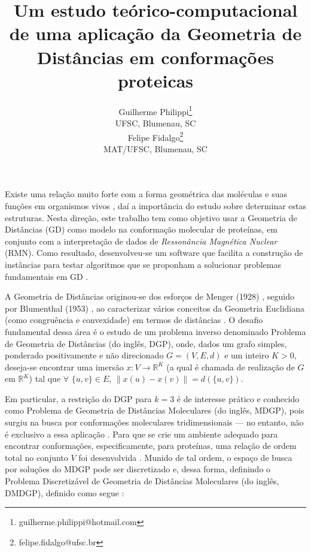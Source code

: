\documentclass[a4,11pt]{pssbmac}
\begin{document}
	
	\title{Um estudo teórico-computacional de uma aplicação da Geometria de Distâncias em conformações proteicas}
	
	\author{
		{\large Guilherme Philippi}\thanks{guilherme.philippi@hotmail.com}\\
		{\small UFSC, Blumenau, SC} \\
		{\large Felipe Fidalgo}\thanks{felipe.fidalgo@ufsc.br} \\
		{\small MAT/UFSC, Blumenau, SC} \\
	}
	\criartitulo
	
	Existe uma relação muito forte com a forma geométrica das moléculas e suas funções em organismos vivos \cite{bioquimicaLehninger}, daí a importância do estudo sobre determinar estas estruturas. Nesta direção, este trabalho tem como objetivo usar a Geometria de Distâncias (GD) como modelo na conformação molecular de proteínas, em conjunto com a interpretação de dados de \textit{Ressonância Magnética Nuclear} (RMN). Como resultado, desenvolveu-se um software que facilita a construção de instâncias para testar algoritmos que se proponham a solucionar problemas fundamentais em GD \cite{carlileGDandAplications}. 
	
	A Geometria de Distâncias originou-se dos esforços de Menger (1928) \cite{menger1928}, seguido por Blumenthal (1953) \cite{blumenthal}, ao caracterizar vários conceitos da Geometria Euclidiana (como congruência e convexidade) em termos de distâncias \cite{carlileGDandAplications}. O desafio fundamental dessa área é o estudo de um problema inverso denominado Problema de Geometria de Distâncias (do inglês, DGP), onde, dados um grafo simples, ponderado positivamente e não direcionado $G=(V,E, d)$ e um inteiro $K>0$, deseja-se encontrar uma imersão $x:V\rightarrow\mathbb{R}^K$ (a qual é chamada de realização de $G$ em $\mathbb{R}^K$) tal que $\forall$ $\{u,v\} \in E$, $\left\|x(u) - x(v)\right\| = d(\{u,v\})$. 
	
	Em particular, a restrição do DGP para $k = 3$ é de interesse prático e conhecido como Problema de Geometria de Distâncias Moleculares (do inglês, MDGP), pois surgiu na busca por conformações moleculares tridimensionais --- no entanto, não é exclusivo a essa aplicação \cite{carlileGDandAplications}. Para que se crie um ambiente adequado para encontrar conformações, especificamente, para proteínas, uma relação de ordem total no conjunto $V$ foi desenvolvida \cite{carlile:MinimalOrder}. Munido de tal ordem, o espaço de busca por soluções do MDGP pode ser discretizado e, dessa forma, definindo o Problema Discretizável de Geometria de Distâncias Moleculares (do inglês, DMDGP), definido como segue \cite{carlileGDandAplications} \cite{carlileDMDGP}:
	
\end{document}
